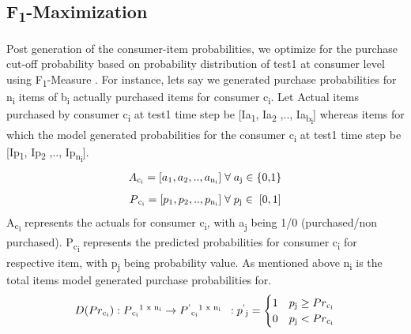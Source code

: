 \subsection{F\textsubscript{1}-Maximization}
Post generation of the consumer-item probabilities, we optimize for the purchase cut-off probability based on 
probability distribution of test1 at consumer level using F\textsubscript{1}-Measure \cite{lipton2014optimal}. 
For instance, lets say we generated purchase probabilities for 
n\textsubscript{i} items of b\textsubscript{i} actually purchased items for consumer c\textsubscript{i}.
Let Actual items purchased by consumer c\textsubscript{i} at test1 time step be [Ia\textsubscript{1}, Ia\textsubscript{2}
,.., Ia\textsubscript{b\textsubscript{i}}] whereas items for which the model generated probabilities for the 
consumer c\textsubscript{i} at test1 time step be [Ip\textsubscript{1}, Ip\textsubscript{2} ,.., 
Ip\textsubscript{n\textsubscript{i}}]. 
  \begin{equation}
    \begin{array}{l}
      A\textsubscript{c\textsubscript{i}} = [a\textsubscript{1}, a\textsubscript{2}, .., a\textsubscript{n\textsubscript{i}}] 
       \; \forall \; a\textsubscript{j} \in \; $\{0,1\}$
    \end{array}
    \label{eqn:A}
  \end{equation}
  \begin{equation}
    \begin{array}{l}
      P\textsubscript{c\textsubscript{i}} = [p\textsubscript{1}, p\textsubscript{2}, .., p\textsubscript{n\textsubscript{i}}]
      \; \forall \; p\textsubscript{j} \in \; [0,1]
    \end{array}
    \label{eqn:P}
  \end{equation}
A\textsubscript{c\textsubscript{i}} represents the actuals for consumer c\textsubscript{i}, with a\textsubscript{j} being 1/0 
(purchased/non purchased). P\textsubscript{c\textsubscript{i}} represents the predicted probabilities 
for consumer c\textsubscript{i} for respective item, with p\textsubscript{j} being probability value. 
As mentioned above n\textsubscript{i} is the total items model generated purchase probabilities for.
  \begin{equation}
    \begin{array}{l}
      D(Pr\textsubscript{c\textsubscript{i}}) : P\textsubscript{c\textsubscript{i}}\textsuperscript{1 x n\textsubscript{i}}
      \to P\textsuperscript{'}\textsubscript{c\textsubscript{i}}\textsuperscript{1 x n\textsubscript{i}}
      \;\; : p\textsuperscript{'}\textsubscript{j} = 
        \begin{cases}
          1 & p\textsubscript{j} \geq Pr\textsubscript{c\textsubscript{i}} \\
          0 & p\textsubscript{j} < Pr\textsubscript{c\textsubscript{i}} 
        \end{cases}
    \end{array}
    \label{eqn:Decision}
  \end{equation}

